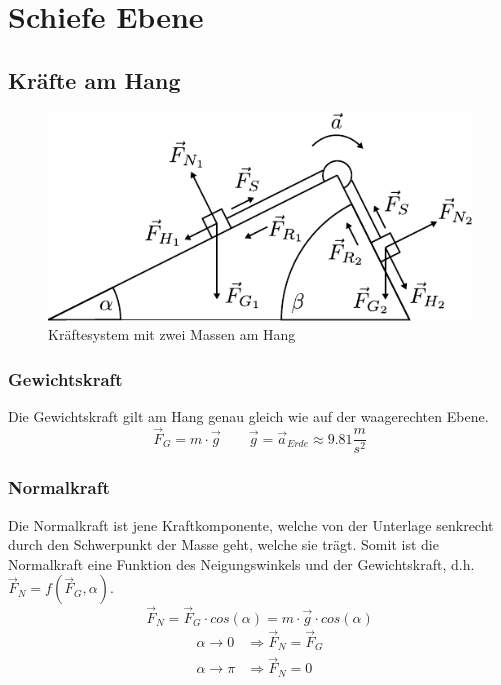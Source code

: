 \chapter{Schiefe Ebene}

\newpage
\section{Kräfte am Hang}
\begin{figure}[h!]
	\centering
	\includegraphics[scale=1]{schiefe-ebene-1.pdf}
	\caption{Kräftesystem mit zwei Massen am Hang}
	\label{fig:hangsystem}
\end{figure}

\subsection{Gewichtskraft}
Die Gewichtskraft gilt am Hang genau gleich wie auf der waagerechten Ebene.
\[ \boxed{\vec{F}_G = m \cdot \vec{g}} 
	\qquad \vec{g} = \vec{a}_{Erde} \approx 9.81\frac{m}{s^2} \]

\subsection{Normalkraft}
Die Normalkraft ist jene Kraftkomponente, welche von der Unterlage senkrecht
durch den Schwerpunkt der Masse geht, welche sie trägt. Somit ist die 
Normalkraft eine Funktion des Neigungswinkels und der Gewichtskraft, d.h.
$\vec{F}_N = f(\vec{F}_G, \alpha)$.
\[ \boxed{ \vec{F}_N 
	= \vec{F}_G \cdot cos(\alpha) 
	= m \cdot \vec{g} \cdot cos(\alpha)} 
\]
\[ \begin{array}{ll}
	\alpha \rightarrow 0 & \Rightarrow \vec{F}_N = \vec{F}_G \\
	\alpha \rightarrow \pi & \Rightarrow \vec{F}_N = 0
\end{array} \]

